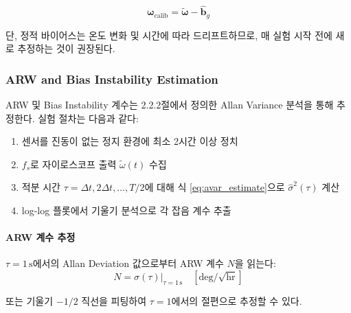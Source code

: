             \begin{equation}
                \boldsymbol{\omega}_{\text{calib}} = \tilde{\boldsymbol{\omega}} - \hat{\mathbf{b}}_g
                \label{eq:gyro_calib}
            \end{equation}

            단, 정적 바이어스는 온도 변화 및 시간에 따라 드리프트하므로, 매 실험 시작 전에 새로 추정하는 것이 권장된다.\\

        \subsubsection{ARW and Bias Instability Estimation}
            ARW 및 Bias Instability 계수는 2.2.2절에서 정의한 Allan Variance 분석을 통해 추정한다. 실험 절차는 다음과 같다:\\

            \begin{enumerate}
                \item 센서를 진동이 없는 정지 환경에 최소 2시간 이상 정치
                \item $f_s$로 자이로스코프 출력 $\tilde{\omega}(t)$ 수집
                \item 적분 시간 $\tau = \Delta t, 2\Delta t, \ldots, T/2$에 대해
                    식 \eqref{eq:avar_estimate}으로 $\hat{\sigma}^2(\tau)$ 계산
                \item log-log 플롯에서 기울기 분석으로 각 잡음 계수 추출
            \end{enumerate}

            \paragraph{ARW 계수 추정}
                $\tau = 1\,\text{s}$에서의 Allan Deviation 값으로부터 ARW 계수 $N$을 읽는다:\\

                \begin{equation}
                    N = \sigma(\tau)\big|_{\tau=1\,\text{s}} \quad [\text{deg}/\sqrt{\text{hr}}]
                    \label{eq:arw_coeff}
                \end{equation}

                또는 기울기 $-1/2$ 직선을 피팅하여 $\tau = 1$에서의 절편으로 추정할 수 있다.\\

